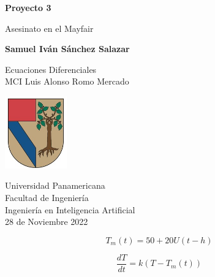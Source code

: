 \documentclass[letter paper, 12pt]{report}
\begin{document}
\begin{titlepage}
   \begin{center}
        \vspace*{1cm}

        \textbf{Proyecto 3}

        \vspace{0.5cm}
            Asesinato en el Mayfair
                
        \vspace{1.5cm}

        \textbf{Samuel Iván Sánchez Salazar}

        \vfill
                
        Ecuaciones Diferenciales\\ 
        MCI Luis Alonso Romo Mercado
                
        \vspace{0.5cm}
        
        \includegraphics[width=0.2\textwidth]{logo}

        \vspace{0.5cm}
                
        Universidad Panamericana\\ 
        Facultad de Ingeniería\\
        Ingeniería en Inteligencia Artificial\\ 
        28 de Noviembre 2022
            
   \end{center}
\end{titlepage}







\begin{equation}
    T_m(t) = 50 + 20  U(t - h)
\end{equation}

\begin{equation}
    \frac{dT}{dt} = k(T - T_m(t))
\end{equation}
\end{document}
